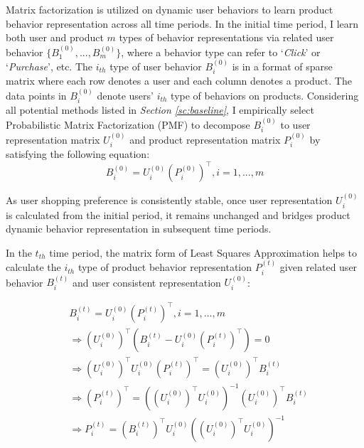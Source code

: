 Matrix factorization is utilized on dynamic user behaviors to learn product behavior representation across all time periods. In the initial time period, I learn both user and product $m$ types of behavior representations via related user behavior $\{B^{(0)}_{1},...,B^{(0)}_{m}\}$, where a behavior type can refer to `\textit{Click}' or `\textit{Purchase}', etc. The $i_{th}$ type of user behavior $B^{(0)}_{i}$ is in a format of sparse matrix where each row denotes a user and each column denotes a product. The data points in $B^{(0)}_{i}$ denote users' $i_{th}$ type of behaviors on products. Considering all potential methods listed in \textit{Section \ref{sc:baseline}}, I empirically select Probabilistic Matrix Factorization (PMF) to decompose $B^{(0)}_{i}$ to user representation matrix $U^{(0)}_{i}$ and product representation matrix $P^{(0)}_{i}$ by satisfying the following equation:
\begin{equation}
B^{(0)}_{i} = U^{(0)}_{i} (P^{(0)}_{i})^\intercal, i = 1,...,m
\end{equation}

As user shopping preference is consistently stable, once user representation $U^{(0)}_{i}$ is calculated from the initial period, it remains unchanged and bridges product dynamic behavior representation in subsequent time periods. 

In the $t_{th}$ time period, the matrix form of Least Squares Approximation \cite{nasrabadi2007pattern} helps to calculate the $i_{th}$ type of product behavior representation $P^{(t)}_{i}$ given related user behavior $B^{(t)}_{i}$ and user consistent representation $U^{(0)}_{i}$:
 
\begin{equation}
\begin{aligned} 
& B^{(t)}_{i} = U^{(0)}_{i} (P^{(t)}_{i})^\intercal, i = 1,...,m \\
& \Rightarrow (U^{(0)}_{i})^\intercal (B^{(t)}_{i} - U^{(0)}_{i} (P^{(t)}_{i})^\intercal) = 0 \\
& \Rightarrow (U^{(0)}_{i})^\intercal U^{(0)}_{i} (P^{(t)}_{i})^\intercal = (U^{(0)}_{i})^\intercal B^{(t)}_{i} \\ 
& \Rightarrow (P^{(t)}_{i})^\intercal = (( U^{(0)}_{i})^\intercal U^{(0)}_{i})^{-1}(U^{(0)}_{i})^\intercal B^{(t)}_{i} \\
& \Rightarrow P_{i}^{(t)} = (B_{i}^{(t)})^\intercal U^{(0)}_{i}(( U^{(0)}_{i})^\intercal U^{(0)}_{i})^{-1}
\end{aligned}
\end{equation}


